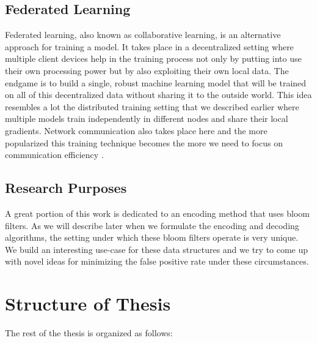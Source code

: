        \subsection{Federated Learning}
            Federated learning, also known as collaborative learning, is an alternative approach for training a model. It takes place in a decentralized setting where multiple client devices help in the training process not only by putting into use their own processing power but by also exploiting their own local data.
            The endgame is to build a single, robust machine learning model that will be trained on all of this decentralized data without sharing it to the outside world. This idea resembles a lot the distributed training setting that we described earlier where multiple models train independently in different nodes and share their local gradients. Network communication also takes place here and the more popularized this training technique becomes the more we need to focus on communication efficiency \cite{konen2016federated}.
        \subsection{Research Purposes}
            A great portion of this work is dedicated to an encoding method that uses bloom filters.
            As we will describe later when we formulate the encoding and decoding algorithms, 
            the setting under which these bloom filters operate is very unique. 
            We build an interesting use-case for these data structures and we try to come up with novel ideas for minimizing the false positive rate under these circumstances.
    
    
    \section{Structure of Thesis}
        The rest of the thesis is organized as follows:
        
